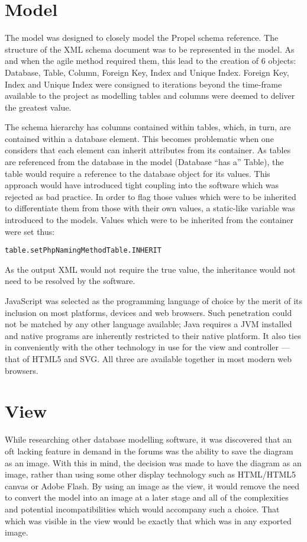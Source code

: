 \section{Model}\label{sec:DesignModel}
The model was designed to closely model the Propel schema reference. The structure of the XML schema document was to be represented in the model. As and when the agile method required them, this lead to the creation of 6 objects: Database, Table, Column, Foreign Key, Index and Unique Index. Foreign Key, Index and Unique Index were consigned to iterations beyond the time-frame available to the project as modelling tables and columns were deemed to deliver the greatest value.

The schema hierarchy has columns contained within tables, which, in turn, are contained within a database element. This becomes problematic when one considers that each element can inherit attributes from its container. As tables are referenced from the database in the model (Database ``has a'' Table), the table would require a reference to the database object for its values. This approach would have introduced tight coupling into the software which was rejected as bad practice. In order to flag those values which were to be inherited to differentiate them from those with their own values, a static-like variable was introduced to the models. Values which were to be inherited from the container were set thus:
\begin{alltt}table.setPhpNamingMethod Table.INHERIT\end{alltt}
As the output XML would not require the true value, the inheritance would not need to be resolved by the software.

JavaScript was selected as the programming language of choice by the merit of its inclusion on most platforms, devices and web browsers. Such penetration could not be matched by any other language available; Java requires a JVM installed and native programs are inherently restricted to their native platform. It also ties in conveniently with the other technology in use for the view and controller --- that of HTML5 and SVG. All three are available together in most modern web browsers.

\section{View}
While researching other database modelling software, it was discovered that an oft lacking feature in demand in the forums was the ability to save the diagram as an image. With this in mind, the decision was made to have the diagram as an image, rather than using some other display technology such as HTML\slash HTML5 canvas or Adobe Flash. By using an image as the view, it would remove the need to convert the model into an image at a later stage and all of the complexities and potential incompatibilities which would accompany such a choice. That which was visible in the view would be exactly that which was in any exported image.

